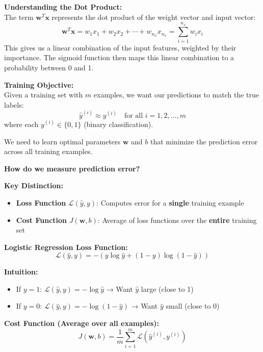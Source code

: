 \documentclass[11pt,a4paper]{article}
\theoremstyle{definition}
\theoremstyle{remark}
\newcommand{\vect}[1]{\bm{#1}}
\begin{document}
\vspace{0.4cm}

\begin{intuition}
\textbf{Understanding the Dot Product:} \\
The term $\vect{w}^T \vect{x}$ represents the dot product of the weight vector and input vector:
\[
\vect{w}^T \vect{x} = w_1 x_1 + w_2 x_2 + \cdots + w_{n_x} x_{n_x} = \sum_{i=1}^{n_x} w_i x_i
\]
This gives us a linear combination of the input features, weighted by their importance. The sigmoid function then maps this linear combination to a probability between 0 and 1.
\end{intuition}

\vspace{0.4cm}

\begin{keyconcept}
\textbf{Training Objective:} \\
Given a training set with $m$ examples, we want our predictions to match the true labels:
\[
\hat{y}^{(i)} \approx y^{(i)} \quad \text{for all } i = 1, 2, \ldots, m
\]
where each $y^{(i)} \in \{0, 1\}$ (binary classification).

We need to learn optimal parameters $\vect{w}$ and $b$ that minimize the prediction error across all training examples.
\end{keyconcept}

\vspace{0.4cm}

\begin{followup}
\textbf{How do we measure prediction error?}

\textbf{Key Distinction:}
\begin{itemize}
    \item \textbf{Loss Function} $\mathcal{L}(\hat{y}, y)$: Computes error for a \textbf{single} training example
    \item \textbf{Cost Function} $J(\vect{w}, b)$: Average of loss functions over the \textbf{entire} training set
\end{itemize}

\textbf{Logistic Regression Loss Function:}
\[
\mathcal{L}(\hat{y}, y) = -(y \log \hat{y} + (1-y) \log(1-\hat{y}))
\]

\textbf{Intuition:}
\begin{itemize}
    \item If $y = 1$: $\mathcal{L}(\hat{y}, y) = -\log \hat{y}$ → Want $\hat{y}$ large (close to 1)
    \item If $y = 0$: $\mathcal{L}(\hat{y}, y) = -\log(1-\hat{y})$ → Want $\hat{y}$ small (close to 0)
\end{itemize}

\textbf{Cost Function (Average over all examples):}
\[
J(\vect{w}, b) = \frac{1}{m} \sum_{i=1}^{m} \mathcal{L}(\hat{y}^{(i)}, y^{(i)})
\]
\end{followup}
\clearpage
\end{document}
